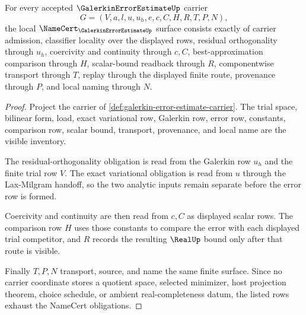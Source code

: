 \begin{theorem}
\label{thm:galerkin-error-estimate-namecert-obligations}
For every accepted $\GalerkinErrorEstimateUp$ carrier
$$
G=(V,a,l,u,u_h,e,c,C,H,R,T,P,N),
$$
the local $\NameCert_{\GalerkinErrorEstimateUp}$ surface consists exactly of carrier admission, classifier locality over the displayed rows, residual orthogonality through $u_h$, coercivity and continuity through $c,C$, best-approximation comparison through $H$, scalar-bound readback through $R$, componentwise transport through $T$, replay through the displayed finite route, provenance through $P$, and local naming through $N$.
\end{theorem}
\begin{proof}
Project the carrier of \autoref{def:galerkin-error-estimate-carrier}. The trial space, bilinear form, load, exact variational row, Galerkin row, error row, constants, comparison row, scalar bound, transport, provenance, and local name are the visible inventory.

The residual-orthogonality obligation is read from the Galerkin row $u_h$ and the finite trial row $V$. The exact variational obligation is read from $u$ through the Lax-Milgram handoff, so the two analytic inputs remain separate before the error row is formed.

Coercivity and continuity are then read from $c,C$ as displayed scalar rows. The comparison row $H$ uses those constants to compare the error with each displayed trial competitor, and $R$ records the resulting $\RealUp$ bound only after that route is visible.

Finally $T,P,N$ transport, source, and name the same finite surface. Since no carrier coordinate stores a quotient space, selected minimizer, host projection theorem, choice schedule, or ambient real-completeness datum, the listed rows exhaust the NameCert obligations.
\end{proof}


